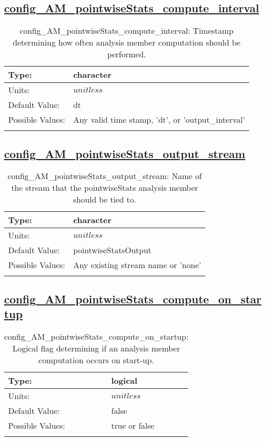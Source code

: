 \subsection[config\_AM\_pointwiseStats\_compute\_interval]{\hyperref[sec:nm_tab_AM_pointwiseStats]{config\_AM\_pointwiseStats\_compute\_interval}}
\label{subsec:nm_sec_config_AM_pointwiseStats_compute_interval}
\begin{center}
\begin{longtable}{| p{2.0in} || p{4.0in} |}
    \hline
    Type: & character \\
    \hline
    Units: & $unitless$ \\
    \hline
    Default Value: & dt \\
    \hline
    Possible Values: & Any valid time stamp, 'dt', or 'output\_interval' \\
    \hline
    \caption{config\_AM\_pointwiseStats\_compute\_interval: Timestamp determining how often analysis member computation should be performed.}
\end{longtable}
\end{center}
\subsection[config\_AM\_pointwiseStats\_output\_stream]{\hyperref[sec:nm_tab_AM_pointwiseStats]{config\_AM\_pointwiseStats\_output\_stream}}
\label{subsec:nm_sec_config_AM_pointwiseStats_output_stream}
\begin{center}
\begin{longtable}{| p{2.0in} || p{4.0in} |}
    \hline
    Type: & character \\
    \hline
    Units: & $unitless$ \\
    \hline
    Default Value: & pointwiseStatsOutput \\
    \hline
    Possible Values: & Any existing stream name or 'none' \\
    \hline
    \caption{config\_AM\_pointwiseStats\_output\_stream: Name of the stream that the pointwiseStats analysis member should be tied to.}
\end{longtable}
\end{center}
\subsection[config\_AM\_pointwiseStats\_compute\_on\_startup]{\hyperref[sec:nm_tab_AM_pointwiseStats]{config\_AM\_pointwiseStats\_compute\_on\_startup}}
\label{subsec:nm_sec_config_AM_pointwiseStats_compute_on_startup}
\begin{center}
\begin{longtable}{| p{2.0in} || p{4.0in} |}
    \hline
    Type: & logical \\
    \hline
    Units: & $unitless$ \\
    \hline
    Default Value: & false \\
    \hline
    Possible Values: & true or false \\
    \hline
    \caption{config\_AM\_pointwiseStats\_compute\_on\_startup: Logical flag determining if an analysis member computation occurs on start-up.}
\end{longtable}
\end{center}
